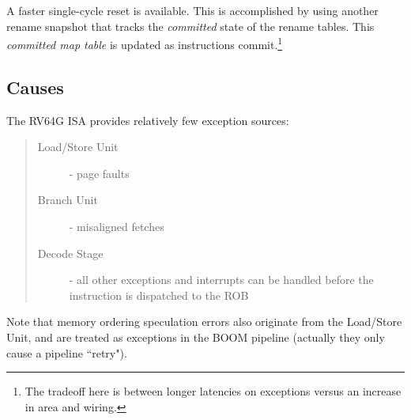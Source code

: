 A faster single-cycle reset is available.  This is accomplished by using another rename snapshot that tracks the {\em committed} state of the rename tables. This {\em committed map table} is updated as instructions commit.\footnote{The tradeoff here is between longer latencies on exceptions versus an increase in area and wiring.}

\subsection{Causes}

The RV64G ISA provides relatively few exception sources:

\begin{quote}
\begin{description}
\item[Load/Store Unit] - page faults
\item[Branch Unit] - misaligned fetches
\item[Decode Stage] - all other exceptions and interrupts can be handled before the instruction is dispatched to the ROB
\end{description}
\end{quote}

Note that memory ordering speculation errors also originate from the Load/Store Unit, and are treated as exceptions in the BOOM pipeline (actually they only cause a pipeline ``retry"). 
